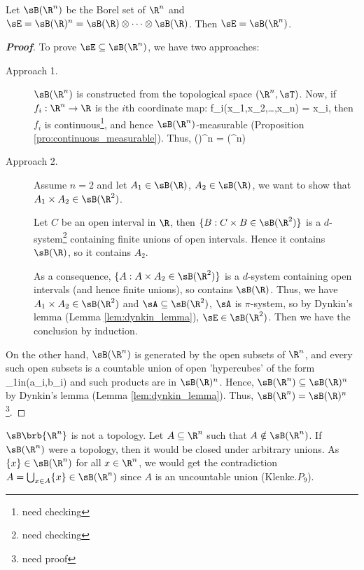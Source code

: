 \begin{proposition}
Let $\sB(\R^n)$ be the Borel set of $\R^n$ and $\sE = \sB(\R)^n = \sB(\R)\otimes \dots\otimes \sB(\R)$. Then $\sE = \sB(\R^n)$.
\end{proposition}
\begin{proof}[\bf Proof]
To prove $\sE\subseteq \sB(\R^n)$, we have two approaches:
\begin{description}
\item [Approach 1.] $\sB(\R^n)$ is constructed from the topological space $(\R^n,\sT)$. Now, if $f_i:\R^n\to \R$ is the $i$th coordinate map:
\be
f_i(x_1,x_2,\dots,x_n) = x_i,
\ee
then $f_i$ is continuous\footnote{need checking}, and hence $\sB(\R^n)$-measurable (Proposition \ref{pro:continuous_measurable}). Thus,
\be
\sB(\R)^n = \sigma{} \subseteq \sB(\R^n)
\ee
\item [Approach 2.] Assume $n=2$ and let $A_1\in \sB(\R)$, $A_2 \in \sB(\R)$, we want to show that $A_1\times A_2 \in \sB(\R^2)$.

Let $C$ be an open interval in $\R$, then $\{B :C\times B \in \sB(\R^2)\}$ is a $d$-system\footnote{need checking} containing finite unions of open intervals. Hence it contains $\sB(\R)$, so it contains $A_2$.

As a consequence, $\{A :A\times A_2\in \sB(\R^2)\}$ is a $d$-system containing open intervals (and hence finite unions), so contains $\sB(\R)$. Thus, we have $A_1\times A_2 \in \sB(\R^2)$ and $\sA \subseteq \sB(\R^2)$, $\sA$ is $\pi$-system, so by Dynkin's lemma (Lemma \ref{lem:dynkin_lemma}), $\sE \in \sB(\R^2)$. Then we have the conclusion by induction.
\end{description}

On the other hand, $\sB(\R^n)$ is generated by the open subsets of $\R^n$, and every such open subsets is a countable union of open 'hypercubes' of the form
\be
\prod_{1\leq i\leq n}(a_i,b_i)
\ee
and such products are in $\sB(\R)^n$. Hence, $\sB(\R^n) \subseteq \sB(\R)^n$ by Dynkin's lemma (Lemma \ref{lem:dynkin_lemma}). Thus, $\sB(\R^n) = \sB(\R)^n$\footnote{need proof}.
\end{proof}

\begin{remark}
$\sB\brb{\R^n}$ is not a topology. Let $A\subseteq \R^n$ such that $A \notin \sB(\R^n)$. If $\sB(\R^n)$ were a topology, then it would be closed under arbitrary unions. As $\{x\}\in \sB(\R^n)$ for all $x\in \R^n$, we would get the contradiction $A = \bigcup_{x\in A}\{x\}\in \sB(\R^n)$ since $A$ is an uncountable union (Klenke\cite{Klenke_2008}.$P_9$).
\end{remark}

